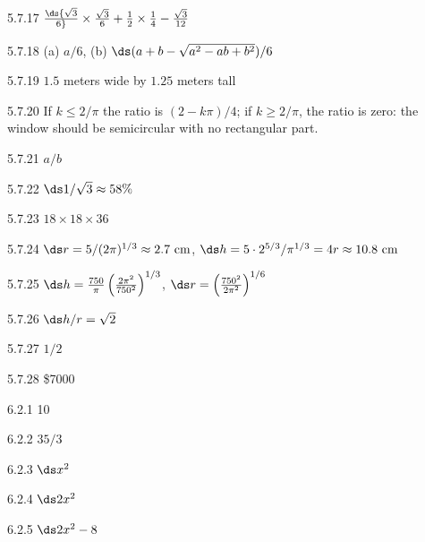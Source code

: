\begin{Answer}{5.7.17}
 $\ds{\sqrt3\over6}\times{\sqrt3\over6}+{1\over2}\times
{1\over4}-{\sqrt3\over 12}$
\end{Answer}
\begin{Answer}{5.7.18}
 (a) $a/6$, (b) $\ds (a+b-\sqrt{a^2-ab+b^2})/6$
\end{Answer}
\begin{Answer}{5.7.19}
 $1.5$ meters wide by $1.25$ meters tall
\end{Answer}
\begin{Answer}{5.7.20}
 If $k\le 2/\pi$ the ratio is $(2-k\pi)/4$; if $k\ge 2/\pi$,
the ratio is zero: the window should be semicircular with no
rectangular part.
\end{Answer}
\begin{Answer}{5.7.21}
 $a/b$
\end{Answer}
\begin{Answer}{5.7.22}
 $\ds 1/\sqrt3\approx 58\%$
\end{Answer}
\begin{Answer}{5.7.23}
 $18\times18\times36$
\end{Answer}
\begin{Answer}{5.7.24}
 $\ds r=5/(2\pi)^{1/3}\approx 2.7\hbox{ cm}$,\hfill\break
$\ds h=5\cdot2^{5/3}/\pi^{1/3}=4r\approx 10.8 \hbox{ cm}$
\end{Answer}
\begin{Answer}{5.7.25}
 $\ds h={750\over\pi}\left({2\pi^2\over 750^2}\right)^{1/3}$,
$\ds r=\left({750^2\over 2\pi^2}\right)^{1/6}$
\end{Answer}
\begin{Answer}{5.7.26}
 $\ds h/r=\sqrt2$
\end{Answer}
\begin{Answer}{5.7.27}
 $1/2$
\end{Answer}
\begin{Answer}{5.7.28}
 \$7000
\end{Answer}
\begin{Answer}{6.2.1}
 10
\end{Answer}
\begin{Answer}{6.2.2}
 $35/3$
\end{Answer}
\begin{Answer}{6.2.3}
 $\ds x^2$
\end{Answer}
\begin{Answer}{6.2.4}
 $\ds 2x^2$
\end{Answer}
\begin{Answer}{6.2.5}
 $\ds 2x^2-8$
\end{Answer}
